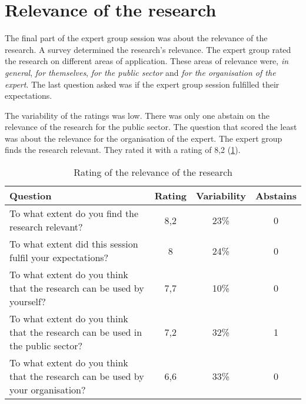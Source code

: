 \section{Relevance of the research}
\label{sec:relevanceofresearch}
The final part of the expert group session was about the relevance of the research. A survey determined the research's relevance. The expert group rated the research on different areas of application. These areas of relevance were, \textit{in general}, \textit{for themselves}, \textit{for the public sector} and \textit{for the organisation of the expert}. The last question asked was if the expert group session fulfilled their expectations.

The variability of the ratings was low. There was only one abstain on the relevance of the research for the public sector. The question that scored the least was about the relevance for the organisation of the expert. The expert group finds the research relevant. They rated it with a rating of 8,2 (\cref{tab:relevanceofresearch}).
\begin{table}[H]
	\centering
	\begin{tabular}{p{}ccc}
		\toprule
		\textbf{Question} & \textbf{Rating} & \textbf{Variability} & \textbf{Abstains} \\
		\midrule
		To what extent do you find the research relevant? & 8,2 & 23\% & 0 \\%
		To what extent did this session fulfil your expectations? & 8 & 24\% & 0 \\%
		To what extent do you think that the research can be used by yourself? & 7,7 & 10\% & 0 \\%
		To what extent do you think that the research can be used in the public sector? & 7,2 & 32\% & 1 \\%
		To what extent do you think that the research can be used by your organisation? & 6,6 & 33\% & 0 \\%
		\bottomrule
	\end{tabular}%
	\caption[Rating of the relevance of the research]{Rating of the relevance of the research}
	\label{tab:relevanceofresearch}%
\end{table}%